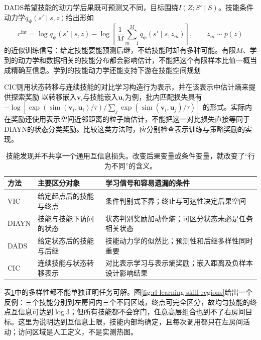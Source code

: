 DADS希望技能的动力学后果既可预测又不同，目标围绕$I(Z;S'\mid S)$。技能条件动力学$q_{\bm\psi}(s'\mid s,z)$给出形如
\[
 r^{\mathrm{int}}
   =\log q_{\bm\psi}(s'\mid s,z)
    -\log\left[\frac{1}{M}\sum_{m=1}^{M}
                      q_{\bm\psi}(s'\mid s,z_m)\right],
       \qquad z_m\sim p(z)
\]
的近似训练信号：给定技能要能预测后继，不给技能时却有多种可能。有限$M$、学到的动力学和数据相关的技能分布都会影响估计，不能把这个有限样本比值一概当成精确互信息。学到的技能动力学还能支持下游在技能空间规划

CIC则用状态转移与连续技能的对比学习构造行为表示，并在该表示中估计熵来提供探索奖励
以转移嵌入$\bm v_i$与技能嵌入$\bm u_i$为例，批内匹配损失具有
$-\log[\exp(\operatorname{sim}(\bm v_i,\bm u_i)/\tau)/
\sum_j\exp(\operatorname{sim}(\bm v_i,\bm u_j)/\tau)]$
的形式。实际内在奖励还使用表示空间近邻距离的粒子熵估计，不能把这一对比损失直接等同于DIAYN的状态分类奖励。比较这类方法时，应分别检查表示训练与策略奖励的实现。

\begin{table}[t]
  \centering
  \small
  \begin{tabularx}{\linewidth}{>{\raggedright\arraybackslash}p{19mm} >{\raggedright\arraybackslash}X >{\raggedright\arraybackslash}X}
    \toprule
    方法 & 主要区分对象 & 学习信号和容易遗漏的条件 \\
    \midrule
    VIC & 给定起点后的技能与终点 & 条件判别式下界；终止与可达性决定后果空间 \\
    DIAYN & 技能与技能下访问的状态 & 状态判别奖励加动作熵；可区分状态未必是任务相关状态 \\
    DADS & 给定状态后的技能与后继 & 技能动力学的似然比；预测性和后继多样性同时重要 \\
    CIC & 连续技能与状态转移表示 & 对比表示学习与表示熵奖励；嵌入距离及负样本设计影响结果 \\
    \bottomrule
  \end{tabularx}
  \caption{技能发现并不共享一个通用互信息损失。改变后果变量或条件变量，就改变了“行为不同”的含义。}
  \label{tab:rl-learning-skill-objectives}
\end{table}

表\ref{tab:rl-learning-skill-objectives}中的多样性都不能单独证明任务可解。图\ref{fig:rl-learning-skill-regions}给出一个反例：三个技能分别到左房间内三个不同区域，终点可完全区分，故均匀技能的终点互信息可达到$\log3$；但所有技能都不会穿门，任意高层组合也到不了右房间目标。这里为说明达到互信息上限，技能内部均确定，且每次调用都只在左房间活动；访问区域是人工定义，不是实测热图。

